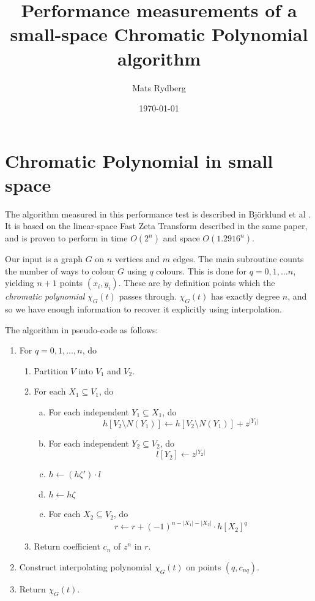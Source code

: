 \documentclass[a4paper]{article}
\title{\huge{Performance measurements of a small-space Chromatic Polynomial algorithm}}
\author{Mats Rydberg}
\date{\today}
\begin{document}
\maketitle

\section{Chromatic Polynomial in small space}
The algorithm measured in this performance test is described in Björklund et al \cite{cov_pack}. It is based on the linear-space Fast Zeta Transform described in the same paper, and is proven to perform in time $O(2^n)$ and space $O(1.2916^n)$.

Our input is a graph $G$ on $n$ vertices and $m$ edges. The main subroutine counts the number of ways to colour $G$ using $q$ colours. This is done for $q = 0, 1, \ldots n$, yielding $n + 1$ points $(x_i, y_i)$. These are by definition points which the \emph{chromatic polynomial} $\chi_G(t)$ passes through. $\chi_G(t)$ has exactly degree $n$, and so we have enough information to recover it explicitly using interpolation.

The algorithm in pseudo-code as follows:

\begin{enumerate}[{Step} I.]
 \item \label{q} For $q = 0, 1, \ldots, n$, do
 \begin{enumerate}[1.]
  \item Partition $V$ into $V_1$ and $V_2$.
  \item \label{step1} For each $X_1 \subseteq V_1$, do
  \begin{enumerate}[a)]
   \item \label{indep1} For each independent $Y_1 \subseteq X_1$, do
$$ h[V_2 \setminus N(Y_1)] \leftarrow h[V_2 \setminus N(Y_1)] + z^{|Y_1|} $$
   \item \label{indep2} For each independent $Y_2 \subseteq V_2$, do
$$ l[Y_2] \leftarrow z^{|Y_2|} $$
   \item $h \leftarrow (h\zeta')\cdot l$
   \item $h \leftarrow h\zeta$
   \item For each $X_2 \subseteq V_2$, do
$$ r \leftarrow r + (-1)^{n - |X_1| - |X_2|}\cdot h[X_2]^q $$
  \end{enumerate}
  \item Return coefficient $c_n$ of $z^n$ in $r$.
 \end{enumerate}
 \item Construct interpolating polynomial $\chi_G(t)$ on points $(q, c_{nq})$.
 \item Return $\chi_G(t)$.
\end{enumerate}
\end{document}
